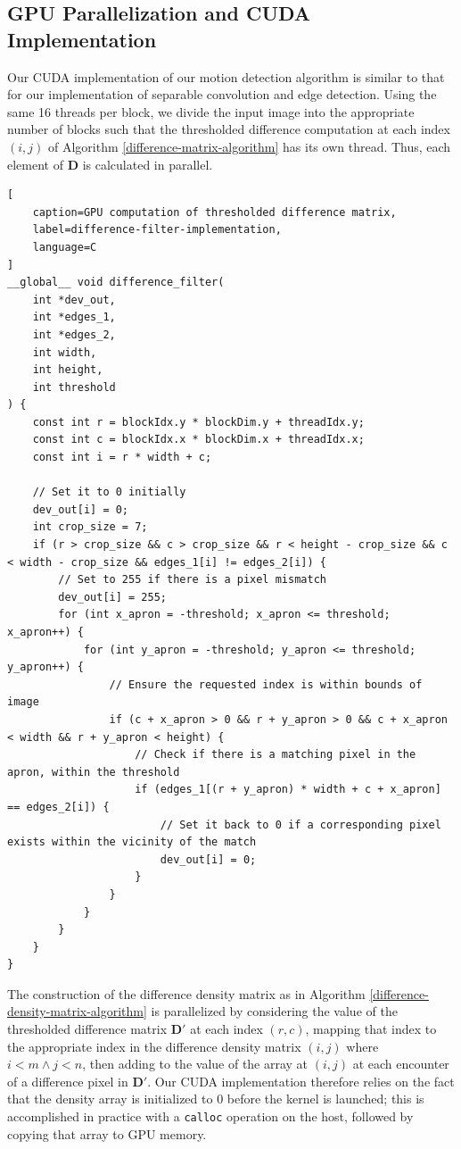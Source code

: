 \documentclass[journal]{IEEEtran}
\begin{document}
\subsection{GPU Parallelization and CUDA Implementation}
Our CUDA implementation of our motion detection algorithm is similar to that for our implementation of separable convolution and edge detection. Using the same 16 threads per block, we divide the input image into the appropriate number of blocks such that the thresholded difference computation at each index $(i, j)$ of Algorithm \ref{difference-matrix-algorithm} has its own thread. Thus, each element of $\boldsymbol{D}$ is calculated in parallel.
\begin{lstlisting}[
	caption=GPU computation of thresholded difference matrix,
	label=difference-filter-implementation,
	language=C
]
__global__ void difference_filter(
	int *dev_out,
	int *edges_1,
	int *edges_2,
	int width,
	int height,
	int threshold
) {
	const int r = blockIdx.y * blockDim.y + threadIdx.y;
	const int c = blockIdx.x * blockDim.x + threadIdx.x;
	const int i = r * width + c;

    // Set it to 0 initially
    dev_out[i] = 0;
    int crop_size = 7;
    if (r > crop_size && c > crop_size && r < height - crop_size && c < width - crop_size && edges_1[i] != edges_2[i]) {
        // Set to 255 if there is a pixel mismatch
        dev_out[i] = 255;
        for (int x_apron = -threshold; x_apron <= threshold; x_apron++) {
            for (int y_apron = -threshold; y_apron <= threshold; y_apron++) {
                // Ensure the requested index is within bounds of image
                if (c + x_apron > 0 && r + y_apron > 0 && c + x_apron < width && r + y_apron < height) {
                    // Check if there is a matching pixel in the apron, within the threshold
                    if (edges_1[(r + y_apron) * width + c + x_apron] == edges_2[i]) {
                        // Set it back to 0 if a corresponding pixel exists within the vicinity of the match
                        dev_out[i] = 0;
                    }
                }
            }
        }
    }
}
\end{lstlisting}
The construction of the difference density matrix as in Algorithm \ref{difference-density-matrix-algorithm} is parallelized by considering the value of the thresholded difference matrix $\boldsymbol{D}'$ at each index $(r, c)$, mapping that index to the appropriate index in the difference density matrix $(i, j)$ where $i < m \wedge j < n$, then adding to the value of the array at $(i, j)$ at each encounter of a difference pixel in $\boldsymbol{D}'$. Our CUDA implementation therefore relies on the fact that the density array is initialized to 0 before the kernel is launched; this is accomplished in practice with a \texttt{calloc} operation on the host, followed by copying that array to GPU memory.
\end{document}
